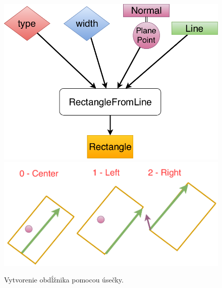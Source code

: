 \begin{figure}[H]
	\centering
	\includegraphics[height=0.3\textwidth]{obrazky-figures/Diagram/Surface/DP Navrh operacii-2D - SurfaceRectangleFromLine.pdf}
	\includegraphics[height=0.3\textwidth]{obrazky-figures/Diagram/Draw/3Plane/DP Navrh operacii-2D - SurfaceRectangleFromLine.pdf}
	\caption{Vytvorenie obdĺžnika pomocou úsečky.}
	\label{fig:SurfaceRectangleFromLine}
\end{figure}






